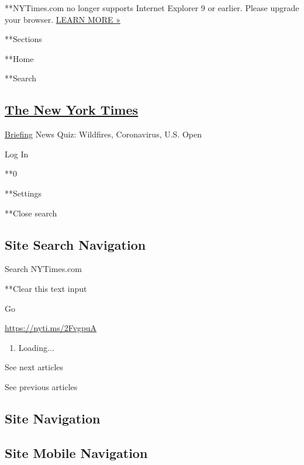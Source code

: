  **NYTimes.com no longer supports Internet Explorer 9 or earlier. Please
upgrade your browser.
\href{http://www.nytimes3xbfgragh.onion/content/help/site/ie9-support.html}{LEARN
MORE »}

**Sections

**Home

**Search

\hypertarget{the-new-york-times}{%
\subsection{\texorpdfstring{\href{http://www.nytimes3xbfgragh.onion/}{The
New York Times}}{The New York Times}}\label{the-new-york-times}}


\href{/interactive/2018/briefing/global-morning-briefing-newsletter-signup.html}{Briefing}
\textbar{}News Quiz: Wildfires, Coronavirus, U.S. Open

Log In

**0

**Settings

**Close search

\hypertarget{site-search-navigation}{%
\subsection{Site Search Navigation}\label{site-search-navigation}}

Search NYTimes.com

**Clear this text input

Go

\url{https://nyti.ms/2FvgpuA}

\begin{enumerate}
\def\labelenumi{\arabic{enumi}.}
\item
  Loading...
\end{enumerate}

See next articles

See previous articles

\hypertarget{site-navigation}{%
\subsection{Site Navigation}\label{site-navigation}}

\hypertarget{site-mobile-navigation}{%
\subsection{Site Mobile Navigation}\label{site-mobile-navigation}}

